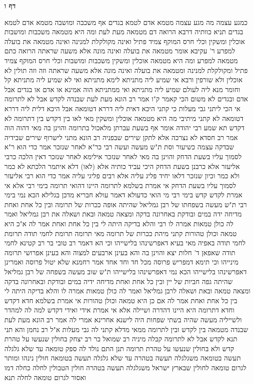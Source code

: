 \documentclass[12pt, openany]{book}
\newcommand{\sethebfont}{
\fontsize{10.5pt}{21.0pt} \selectfont
}
\newcommand{\twocol}[1]{
	{\sethebfont \begin{multicols}{2}
			#1
	\end{multicols}}	
}
\newcommand{\sectname}{}
\newcommand{\newsection}[1]{
	\addcontentsline{toc}{section}{#1}
	\renewcommand{\sectname}{#1}	
	\vspace{-\baselineskip}
	\begin{center}
		\textbf{%
\fontsize{16pt}{16pt}\selectfont
			#1}
	\end{center}
	\vspace{-\baselineskip}
	\nopagebreak
}
\begin{document}
\newsection{דף ו}
\twocol{כמגע עצמה מה מגע עצמה מטמא אדם לטמא בגדים אף משכבה ומושבה מטמא אדם לטמא בגדים 
תניא כוותיה דרבא הרואה דם מטמאה מעת לעת ומה היא מטמאה משכבות ומושבות אוכלין ומשקין וכלי חרס המוקף צמיד פתיל ואינה מקולקלת למנינה ואינה מטמאה את בועלה למפרע ר' עקיבא אומר מטמאה את בועלה ואינה מונה אלא משעה שראתה 
הרואה כתם מטמאה למפרע ומה היא מטמאה אוכלין ומשקין משכבות ומושבות וכלי חרס המוקף צמיד פתיל ומקולקלת למנינה ומטמאה את בועלה ואינה מונה אלא משעה שראתה 
וזה וזה תולין לא אוכלין ולא שורפין 
ורבא אי שמיע ליה מתניתא לימא מתניתא ואי לא שמיע ליה מתניתא קל וחומר מנא ליה 
לעולם שמיע ליה מתניתא ואי ממתניתא הוה אמינא או אדם או בגדים אבל אדם ובגדים לא משום הכי קאמר ק"ו 
אמר רב הונא מעת לעת שבנדה לקדש אבל לא לתרומה אי הכי ליתני גבי מעלות כי קתני היכא דאית ליה דררא דטומאה אבל היכא דלית ליה דררא דטומאה לא קתני 
מיתיבי מה היא מטמאה אוכלין ומשקין מאי לאו בין דקדש בין דתרומה לא דקדש 
תא שמע רבי יהודה אומר אף בשעת עברתן מלאכול בתרומה והוינן בה מאי דהוה הוה 
אמר רב חסדא לא נצרכה אלא לתקן שירים שבפניה 
רב הונא מתני לישרוף שירים שבידיה שבדקה עצמה כשיעור וסת 
ת"ש מעשה ועשה רבי כר"א
לאחר שנזכר אמר כדי הוא ר"א לסמוך עליו
בשעת הדחק והוינן בה מאי לאחר שנזכר אילימא לאחר שנזכר דאין הלכה כרבי אליעזר אלא כרבנן בשעת הדחק היכי עביד כותיה 
אלא (לאו) דלא איתמר הלכתא לא כמר ולא כמר וכיון שנזכר דלאו יחיד פליג עליה אלא רבים פליגי עליה אמר כדי הוא רבי אליעזר לסמוך עליו בשעת הדחק 
אי אמרת בשלמא לתרומה היינו דהואי תרומה בימי רבי אלא אי אמרת לקדש קדש בימי רבי מי הואי 
כדעולא דאמר עולא חבריא מדכן בגלילא הכא נמי בימי רבי 
ת"ש מעשה בשפחתו של רבן גמליאל שהיתה אופה ככרות של תרומה ובין כל אחת ואחת מדיחה ידה במים ובודקת באחרונה בדקה ומצאה טמאה ובאת ושאלה את רבן גמליאל ואמר לה כולן טמאות אמרה לו רבי והלא בדיקה היתה לי בין כל אחת ואחת אמר לה א"כ היא טמאה וכולן טהורות 
קתני מיהת ככרות של תרומה מאי תרומה תרומת לחמי תודה תרומת לחמי תודה באפיה מאי בעיא 
דאפרשינהו בלישייהו וכי הא דאמר רב טובי בר רב קטינא לחמי תודה שאפאן ד' חלות יצא והוינן בה והא בעינן ארבעים למצוה 
והא בעינן אפרושי תרומה מינייהו וכי תימא דמפריש פרוסה מכל חד וחד אחד אמר רחמנא שלא יטול פרוסה ואמרינן דאפרשינהו בלישייהו הכא נמי דאפרשינהו בלישייהו 
ת"ש שוב מעשה בשפחה של רבן גמליאל שהיתה גפה חביות של יין ובין כל אחת ואחת מדיחה ידיה במים ובודקת ובאחרונה בדקה ומצאה טמאה ובאת ושאלה לרבן גמליאל ואמר לה כולן טמאות אמרה לו והלא בדיקה היתה לי בין כל אחת ואחת אמר לה אם כן היא טמאה וכולן טהורות 
אי אמרת בשלמא חדא דקדש וחדא דתרומה היא היינו דהדרה ושיילה אלא אי אמרת אידי ואידי דקדש למה לה למהדר ולשייליה מעשה שהיה בשתי שפחות היה 
לישנא אחרינא אמרי לה אמר רב הונא מעת לעת שבנדה מטמאה בין לקדש ובין לתרומה ממאי מדלא קתני לה גבי מעלות א"ל רב נחמן והא תני תנא לקדש אבל לא לתרומה 
קבלה מיניה רב שמואל בר רב יצחק בחולין שנעשו על טהרת קדש ולא בחולין שנעשו על טהרת תרומה 
תנן התם נולד לה ספק טומאה עד שלא גלגלה תעשה בטומאה משגלגלה תעשה בטהרה 
עד שלא גלגלה תעשה בטומאה חולין נינהו ומותר לגרום טומאה לחולין שבארץ ישראל משגלגלה תעשה בטהרה חולין הטבולין לחלה כחלה דמו ואסור לגרום טומאה לחלה 
תנא}
\end{document}
